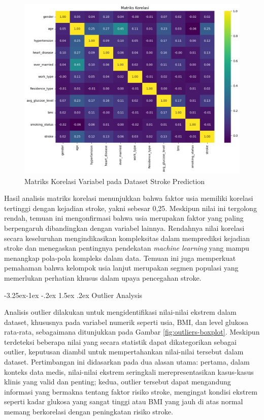 \documentclass[10pt]{article}
\makeatletter
\renewcommand\subsubsection{\@startsection{subsubsection}{3}{\z@}%
  {-3.25ex\@plus -1ex \@minus -.2ex}%
  {1.5ex \@plus .2ex}%
  {\normalfont\itshape\normalsize}}
\makeatother
\begin{document}
\begin{multicols}{2}
    \begin{figure}[H]
        \includegraphics[width=\columnwidth]{./assets/matrix-corelation.png}
        \caption{Matriks Korelasi Variabel pada Dataset Stroke Prediction}%
        \label{fig:matrix-corelation}
    \end{figure}

    Hasil analisis matriks korelasi menunjukkan bahwa faktor usia memiliki korelasi
    tertinggi dengan kejadian stroke, yakni sebesar 0,25. Meskipun nilai ini
    tergolong rendah, temuan ini mengonfirmasi bahwa usia merupakan faktor yang
    paling berpengaruh dibandingkan dengan variabel lainnya. Rendahnya nilai
    korelasi secara keseluruhan mengindikasikan kompleksitas dalam memprediksi
    kejadian stroke dan menegaskan pentingnya pendekatan \textit{machine learning}
    yang mampu menangkap pola-pola kompleks dalam data. Temuan ini juga memperkuat
    pemahaman bahwa kelompok usia lanjut merupakan segmen populasi yang memerlukan
    perhatian khusus dalam upaya pencegahan stroke.

    \subsubsection{Outlier Analysis}

    Analisis outlier dilakukan untuk mengidentifikasi nilai-nilai ekstrem dalam
    dataset, khususnya pada variabel numerik seperti usia, BMI, dan level glukosa
    rata-rata, sebagaimana ditunjukkan pada Gambar \ref{fig:outliers-boxplot}.
    Meskipun terdeteksi beberapa nilai yang secara statistik dapat dikategorikan
    sebagai outlier, keputusan diambil untuk mempertahankan nilai-nilai tersebut
    dalam dataset. Pertimbangan ini didasarkan pada dua alasan utama: pertama,
    dalam konteks data medis, nilai-nilai ekstrem seringkali merepresentasikan
    kasus-kasus klinis yang valid dan penting; kedua, outlier tersebut dapat
    mengandung informasi yang bermakna tentang faktor risiko stroke, mengingat
    kondisi ekstrem seperti kadar glukosa yang sangat tinggi atau BMI yang jauh di
    atas normal memang berkorelasi dengan peningkatan risiko stroke.


\end{multicols}
\end{document}
